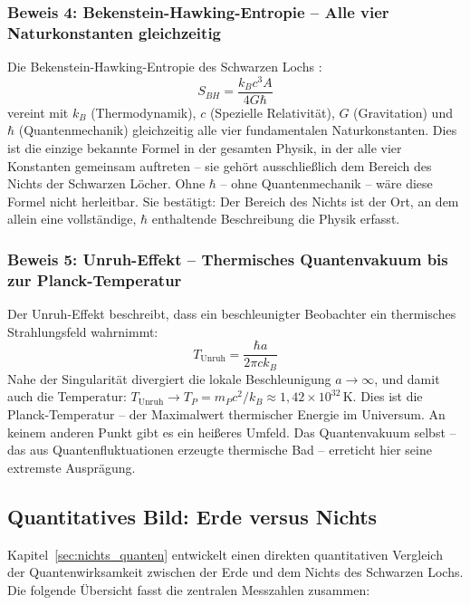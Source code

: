 ﻿\documentclass[12pt,a4paper]{report}
\begin{document}
\subsubsection{Beweis 4: Bekenstein-Hawking-Entropie -- Alle vier Naturkonstanten gleichzeitig}

Die Bekenstein-Hawking-Entropie des Schwarzen Lochs \cite{bekenstein1973,hawking1975}:
\begin{equation*}
    S_{BH} = \frac{k_B c^3 A}{4 G \hbar}
\end{equation*}
vereint mit $k_B$ (Thermodynamik), $c$ (Spezielle Relativität), $G$ (Gravitation) und $\hbar$ (Quantenmechanik) gleichzeitig alle vier fundamentalen Naturkonstanten. Dies ist die einzige bekannte Formel in der gesamten Physik, in der alle vier Konstanten gemeinsam auftreten -- sie gehört ausschließlich dem Bereich des Nichts der Schwarzen Löcher. Ohne $\hbar$ -- ohne Quantenmechanik -- wäre diese Formel nicht herleitbar. Sie bestätigt: Der Bereich des Nichts ist der Ort, an dem allein eine vollständige, $\hbar$ enthaltende Beschreibung die Physik erfasst.

\subsubsection{Beweis 5: Unruh-Effekt -- Thermisches Quantenvakuum bis zur Planck-Tempe\-ratur}

Der Unruh-Effekt \cite{unruh1976} beschreibt, dass ein beschleunigter Beobachter ein thermisches Strahlungsfeld wahrnimmt:
\begin{equation*}
    T_{\mathrm{Unruh}} = \frac{\hbar a}{2\pi c k_B}
\end{equation*}
Nahe der Singularität divergiert die lokale Beschleunigung $a \to \infty$, und damit auch die Temperatur: $T_{\mathrm{Unruh}} \to T_P = m_P c^2 / k_B \approx 1{,}42 \times 10^{32}\,\text{K}$. Dies ist die Planck-Temperatur -- der Maximalwert thermischer Energie im Universum. An keinem anderen Punkt gibt es ein heißeres Umfeld. Das Quantenvakuum selbst -- das aus Quantenfluktuationen erzeugte thermische Bad -- erreticht hier seine extremste Ausprägung.

\subsection{Quantitatives Bild: Erde versus Nichts}

Kapitel~\ref{sec:nichts_quanten} entwickelt einen direkten quantitativen Vergleich der Quantenwirksamkeit zwischen der Erde und dem Nichts des Schwarzen Lochs. Die folgende Übersicht fasst die zentralen Messzahlen zusammen:
\end{document}
